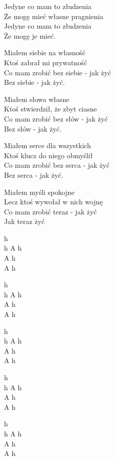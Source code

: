 \begin{text}
    Jedyne co mam to złudzenia\\
    Że mogę mieć własne pragnienia\\
    Jedyne co mam to złudzenia\\
    Że mogę je mieć.

    Miałem siebie na własność\\
    Ktoś zabrał mi prywatność\\
    Co mam zrobić bez siebie - jak żyć\\
    Bez siebie - jak żyć.

    Miałem słowa własne\\
    Ktoś stwierdził, że zbyt ciasne\\
    Co mam zrobić bez słów - jak żyć\\
    Bez słów - jak żyć.

    Miałem serce dla wszystkich\\
    Ktoś klucz do niego obmyślił\\
    Co mam zrobić bez serca - jak żyć\\
    Bez serca - jak żyć.

    Miałem myśli spokojne\\
    Lecz ktoś wywołał w nich wojnę\\
    Co mam zrobić teraz - jak żyć\\
    Jak teraz żyć
\end{text}
\begin{chord}
    h\\
    h A h\\
    A h\\
    A h

    h\\
    h A h\\
    A h\\
    A h

    h\\
    h A h\\
    A h\\
    A h

    h\\
    h A h\\
    A h\\
    A h

    h\\
    h A h\\
    A h\\
    A h
\end{chord}